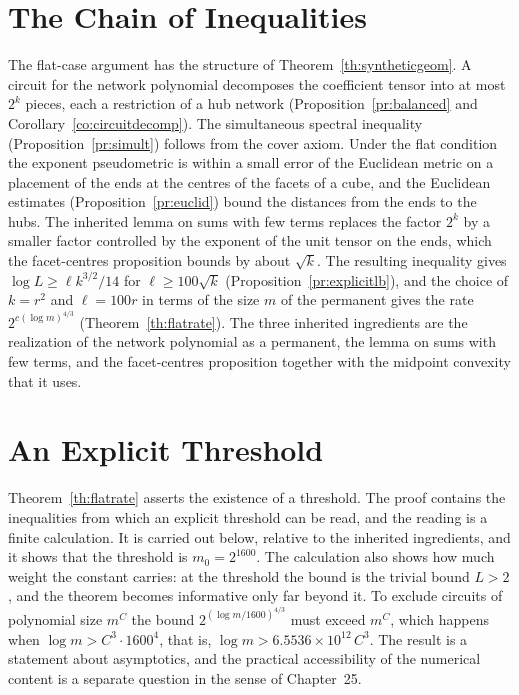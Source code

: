 \documentclass[11pt,letterpaper]{report}
\theoremstyle{plain}
\theoremstyle{definition}
\theoremstyle{remark}
\begin{document}
\section{The Chain of Inequalities}

The flat-case argument has the structure of Theorem~\ref{th:syntheticgeom}. A circuit for the network polynomial decomposes the coefficient tensor into at most $2^k$ pieces, each a restriction of a hub network (Proposition~\ref{pr:balanced} and Corollary~\ref{co:circuitdecomp}). The simultaneous spectral inequality (Proposition~\ref{pr:simult}) follows from the cover axiom. Under the flat condition the exponent pseudometric is within a small error of the Euclidean metric on a placement of the ends at the centres of the facets of a cube, and the Euclidean estimates (Proposition~\ref{pr:euclid}) bound the distances from the ends to the hubs. The inherited lemma on sums with few terms replaces the factor $2^k$ by a smaller factor controlled by the exponent of the unit tensor on the ends, which the facet-centres proposition bounds by about $\sqrt k$. The resulting inequality gives $\log L\ge\ell k^{3/2}/14$ for $\ell\ge100\sqrt k$ (Proposition~\ref{pr:explicitlb}), and the choice of $k=r^2$ and $\ell=100r$ in terms of the size $m$ of the permanent gives the rate $2^{c(\log m)^{4/3}}$ (Theorem~\ref{th:flatrate}). The three inherited ingredients are the realization of the network polynomial as a permanent, the lemma on sums with few terms, and the facet-centres proposition together with the midpoint convexity that it uses.

\section{An Explicit Threshold}

Theorem~\ref{th:flatrate} asserts the existence of a threshold. The proof contains the inequalities from which an explicit threshold can be read, and the reading is a finite calculation. It is carried out below, relative to the inherited ingredients, and it shows that the threshold is $m_0=2^{1600}$. The calculation also shows how much weight the constant carries: at the threshold the bound is the trivial bound $L>2$, and the theorem becomes informative only far beyond it. To exclude circuits of polynomial size $m^C$ the bound $2^{(\log m/1600)^{4/3}}$ must exceed $m^C$, which happens when $\log m>C^3\cdot1600^4$, that is, $\log m>6.5536\times10^{12}\,C^3$. The result is a statement about asymptotics, and the practical accessibility of the numerical content is a separate question in the sense of Chapter~25.
\end{document}
